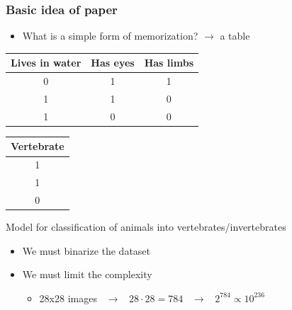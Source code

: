 \documentclass[pdflatex,compress]{beamer}
\begin{document}
\begin{frame}
	\frametitle{Basic idea of paper}
		\begin{itemize}
			\item What is a simple form of memorization? $\rightarrow$ a table
		\end{itemize}
		\vspace{1em}
		\small
		\begin{minipage}{.95\linewidth}\centering
			\begin{minipage}[b]{.6\linewidth}
			\begin{table}[]
			\begin{tabular}{ccc}
			Lives in water          & Has eyes               & Has limbs              \\ \hline
			\multicolumn{1}{|c|}{0} & \multicolumn{1}{c|}{1} & \multicolumn{1}{c|}{1} \\ \hline
			\multicolumn{1}{|c|}{1} & \multicolumn{1}{c|}{1} & \multicolumn{1}{c|}{0} \\ \hline
			\multicolumn{1}{|c|}{1} & \multicolumn{1}{c|}{0} & \multicolumn{1}{c|}{0} \\ \hline
			\end{tabular}
			\end{table}
		\end{minipage}
		\begin{minipage}[b]{.2\linewidth}
				\begin{table}[]
				\begin{tabular}{c}
				Vertebrate              \\ \hline
				\multicolumn{1}{|c|}{1} \\ \hline
				\multicolumn{1}{|c|}{1} \\ \hline
				\multicolumn{1}{|c|}{0} \\ \hline
				\end{tabular}
				\end{table}
			\end{minipage}
		\end{minipage}
	\centering
	Model for classification of animals into vertebrates/invertebrates
	\normalfont
	\vspace{1em}
	\begin{itemize}
		\item We must binarize the dataset
		\item We must limit the complexity
			\begin{itemize}
				\item 28x28 images \, $\rightarrow$ \, $28 \cdot 28 = 784$ \, $\rightarrow$ \, $2^{784} \propto 10^{236}$
			\end{itemize}
	\end{itemize}
\end{frame}
\end{document}
